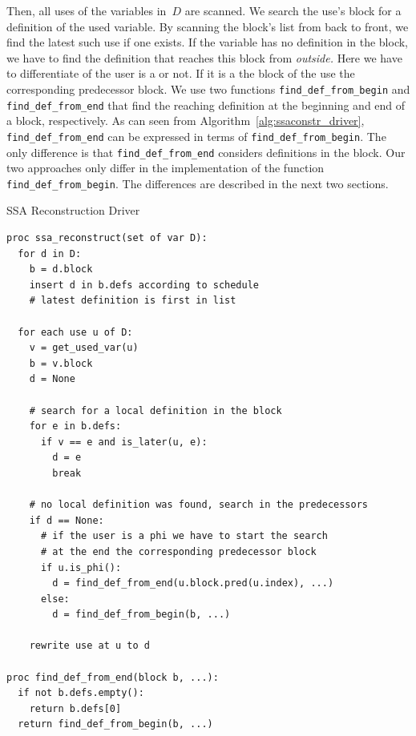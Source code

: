 Then, all uses of the variables in~$D$ are scanned.
We search the use's block for a definition of the used variable.
By scanning the block's list from back to front, we find the latest such use if one exists. 
If the variable has no definition in the block, we have to find the definition that reaches this block from \emph{outside.}
Here we have to differentiate of the user is a \phiop{} or not.
If it is a \phiop{} the block of the use the corresponding predecessor block.
We use two functions \verb|find_def_from_begin| and \verb|find_def_from_end| that find the reaching definition at the beginning and end of a block, respectively. 
As can seen from Algorithm~\ref{alg:ssaconstr_driver}, \verb|find_def_from_end| can be expressed in terms of \verb|find_def_from_begin|. 
The only difference is that \verb|find_def_from_end| considers definitions in the block. 
Our two approaches only differ in the implementation of the function \verb|find_def_from_begin|.
The differences are described in the next two sections.
\begin{algorithm}
	\caption{SSA Reconstruction Driver}
	\label{alg:ssaconstr_driver}

\begin{verbatim}
proc ssa_reconstruct(set of var D):
  for d in D:
    b = d.block
    insert d in b.defs according to schedule
    # latest definition is first in list

  for each use u of D:
    v = get_used_var(u)
    b = v.block
    d = None

    # search for a local definition in the block
    for e in b.defs:
      if v == e and is_later(u, e):
        d = e
        break
        
    # no local definition was found, search in the predecessors
    if d == None:
      # if the user is a phi we have to start the search 
      # at the end the corresponding predecessor block 
      if u.is_phi():
        d = find_def_from_end(u.block.pred(u.index), ...)
      else:
        d = find_def_from_begin(b, ...)

    rewrite use at u to d

proc find_def_from_end(block b, ...):
  if not b.defs.empty():
    return b.defs[0]
  return find_def_from_begin(b, ...)
\end{verbatim}
\end{algorithm}

